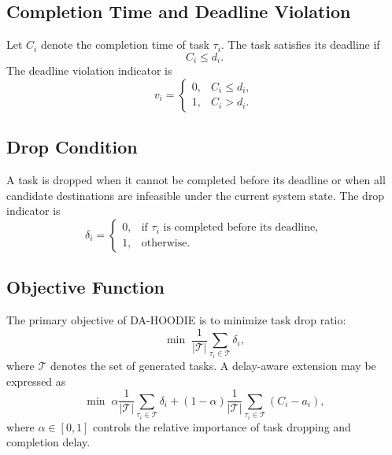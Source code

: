 \documentclass{article}
\begin{document}
\subsection{Completion Time and Deadline Violation}
\label{subsec:completion_time_deadline_violation}

Let $C_i$ denote the completion time of task $\tau_i$. The task satisfies its deadline if
\begin{equation}
    C_i \leq d_i.
\end{equation}
The deadline violation indicator is
\begin{equation}
    v_i=
    \begin{cases}
    0, & C_i \leq d_i,\\
    1, & C_i>d_i.
    \end{cases}
\end{equation}

\subsection{Drop Condition}
\label{subsec:drop_condition}

A task is dropped when it cannot be completed before its deadline or when all candidate destinations are infeasible under the current system state. The drop indicator is
\begin{equation}
    \delta_i=
    \begin{cases}
    0, & \text{if } \tau_i \text{ is completed before its deadline},\\
    1, & \text{otherwise}.
    \end{cases}
\end{equation}

\subsection{Objective Function}
\label{subsec:objective_function}

The primary objective of DA-HOODIE is to minimize task drop ratio:
\begin{equation}
    \min \; \frac{1}{|\mathcal{T}|}\sum_{\tau_i\in\mathcal{T}}\delta_i,
\end{equation}
where $\mathcal{T}$ denotes the set of generated tasks. A delay-aware extension may be expressed as
\begin{equation}
    \min \; \alpha \frac{1}{|\mathcal{T}|}\sum_{\tau_i\in\mathcal{T}}\delta_i
    +(1-\alpha)\frac{1}{|\mathcal{T}|}\sum_{\tau_i\in\mathcal{T}}(C_i-a_i),
\end{equation}
where $\alpha\in[0,1]$ controls the relative importance of task dropping and completion delay.
\end{document}
